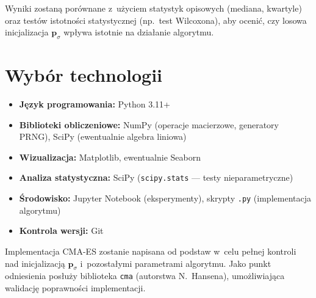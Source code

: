 \documentclass[12pt,a4paper]{article}
\begin{document}
Wyniki zostaną porównane z~użyciem statystyk opisowych (mediana, kwartyle) oraz testów istotności statystycznej (np.\ test Wilcoxona), aby ocenić, czy losowa inicjalizacja $\mathbf{p}_\sigma$ wpływa istotnie na działanie algorytmu.
 
\section{Wybór technologii}
 
\begin{itemize}
    \item \textbf{Język programowania:} Python 3.11+
    \item \textbf{Biblioteki obliczeniowe:} NumPy (operacje macierzowe, generatory PRNG), SciPy (ewentualnie algebra liniowa)
    \item \textbf{Wizualizacja:} Matplotlib, ewentualnie Seaborn
    \item \textbf{Analiza statystyczna:} SciPy (\texttt{scipy.stats} --- testy nieparametryczne)
    \item \textbf{Środowisko:} Jupyter Notebook (eksperymenty), skrypty \texttt{.py} (implementacja algorytmu)
    \item \textbf{Kontrola wersji:} Git
\end{itemize}
 
Implementacja CMA-ES zostanie napisana od podstaw w~celu pełnej kontroli nad inicjalizacją $\mathbf{p}_\sigma$ i~pozostałymi parametrami algorytmu. Jako punkt odniesienia posłuży biblioteka \texttt{cma} (autorstwa N.~Hansena), umożliwiająca walidację poprawności implementacji.
 
\end{document}
